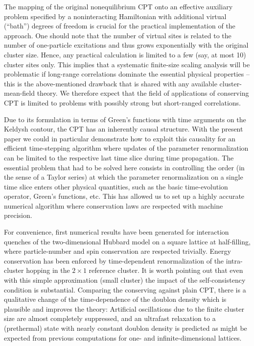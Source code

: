 \documentclass[twocolumn,prb,showpacs,aps,superscriptaddress]{revtex4}
\begin{document}
The mapping of the original nonequilibrium CPT onto an effective auxiliary
problem specified by a noninteracting Hamiltonian with additional virtual
(``bath'') degrees of freedom is crucial for the practical implementation of
the approach.  One should note that the number of virtual sites is related to
the number of one-particle excitations and thus grows exponentially with the
original cluster size.  Hence, any practical calculation is limited to a few
(say, at most 10) cluster sites only.  This implies that a systematic
finite-size scaling analysis will be problematic if long-range correlations
dominate the essential physical properties -- this is the above-mentioned
drawback that is shared with any available cluster-mean-field theory.  We
therefore expect that the field of applications of conserving CPT is limited to
problems with possibly strong but short-ranged correlations.

Due to its formulation in terms of Green's functions with time arguments on the
Keldysh contour, the CPT has an inherently causal structure.  With the present
paper we could in particular demonstrate how to exploit this causality for an
efficient time-stepping algorithm where updates of the parameter
renormalization can be limited to the respective last time slice during time
propagation.  The essential problem that had to be solved here consists in
controlling the order (in the sense of a Taylor series) at which the parameter
renormalization on a single time slice enters other physical quantities, such
as the basic time-evolution operator, Green's functions, etc.  This has allowed
us to set up a highly accurate numerical algorithm where conservation laws are
respected with machine precision.

For convenience, first numerical results have been generated for interaction
quenches of the two-dimensional Hubbard model on a square lattice at
half-filling, where particle-number and spin conservation are respected
trivially.  Energy conservation has been enforced by time-dependent
renormalization of the intra-cluster hopping in the $2\times 1$ reference
cluster.  It is worth pointing out that even with this simple approximation
(small cluster) the impact of the self-consistency condition is substantial.
Comparing the conserving against plain CPT, there is a qualitative change of
the time-dependence of the doublon density which is plausible and improves the
theory: Artificial oscillations due to the finite cluster size are almost
completely suppressed, and an ultrafast relaxation to a (prethermal) state with
nearly constant doublon density is predicted as might be expected from previous
computations for one- and infinite-dimensional lattices.
\end{document}

